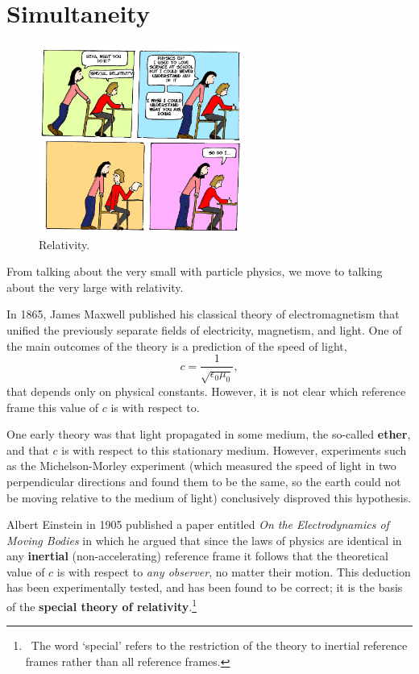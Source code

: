 \documentclass[a4paper]{amsbook}
\theoremstyle{definition}
\numberwithin{exercise}{chapter}
\numberwithin{exercise}{chapter}
\newcommand\capcite[1]{}
\begin{document}
\section{Simultaneity}
\begin{figure}
  \centering
  \includegraphics[width=0.6\textwidth]{relativity}
  \caption{Relativity. \capcite{http://www.lukesurl.com/wp-content/uploads/2008/07/specialrelativitycol.gif} \label{fig:relativity}}
\end{figure}
From talking about the very small with particle physics, we move to talking about the very large with relativity.

In 1865, James Maxwell published his classical theory of electromagnetism that unified the previously separate fields of electricity, magnetism,
and light. One of the main outcomes of the theory is a prediction of the speed of light,
\begin{equation}
  c = \frac{1}{\sqrt{\epsilon_0 \mu_0}},
\end{equation}
that depends only on physical constants. However, it is not clear which reference frame this value of $ c $ is with respect to.

One early theory was that light propagated in some medium, the so-called \textbf{ether}, and that $ c $ is with respect to this
stationary medium. However, experiments such as the Michelson-Morley experiment (which measured the speed of light in two perpendicular
directions and found them to be the same, so the earth could not be moving relative to the medium of light) conclusively disproved
this hypothesis.

Albert Einstein in 1905 published a paper entitled \emph{On the Electrodynamics of Moving Bodies} in which he argued that since
the laws of physics are identical in any \textbf{inertial} (non-accelerating) reference frame it follows that the theoretical
value of $ c $ is with respect to \emph{any observer}, no matter their motion. This deduction has been experimentally tested,
and has been found to be correct; it is the basis of the \textbf{special theory of relativity}.\footnote{~The word `special' refers
to the restriction of the theory to inertial reference frames rather than all reference frames.}
\end{document}
